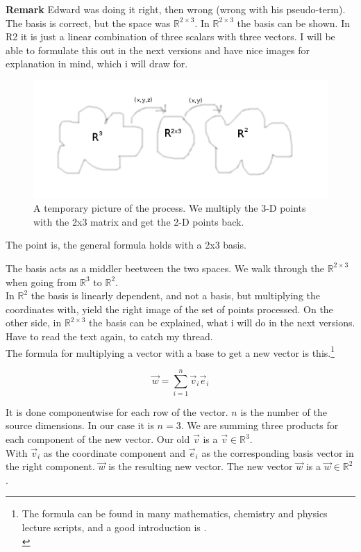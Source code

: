 \documentclass[a4paper]{article}
\begin{document}
\textbf{Remark} Edward was doing it right, then wrong (wrong with his pseudo-term). The basis is correct, but the space was $\mathbb{R}^{2\times{3}}$. In $\mathbb{R}^{2\times{3}}$ the basis can be shown. In R2 it is just a linear combination of three scalars with three vectors. I will be able to formulate this out in the next versions and have nice images for explanation in mind, which i will draw for.
\begin{figure}
\includegraphics{mediator.png}
\caption{A temporary picture of the process. We multiply the 3-D points with the 2x3 matrix and get the 2-D points back.}
\end{figure}

The point is, the general formula holds with a 2x3 basis.

The basis acts as a middler beetween the two spaces. We walk through the $\mathbb{R}^{2\times{3}}$ when going from $\mathbb{R}^{3}$ to $\mathbb{R}^{2}.$\\

In $\mathbb{R}^{2}$ the basis is linearly dependent, and not a basis, but multiplying the coordinates with, yield the right image of the set of points processed. On the other side, in $\mathbb{R}^{2\times{3}}$ the basis can be explained, what i will do in the next versions. Have to read the text again, to catch my thread.\\

The formula for multiplying a vector with a base to get a new vector is this.\footnote{The formula can be found in many mathematics, chemistry and physics lecture scripts, and a good introduction is \cite{Strang1}.\\}

\begin{displaymath}
\vec{w} = \displaystyle\sum_{i=1}^{n} \vec{v}_{i}\vec{e}_{i}
\end{displaymath}

It is done componentwise for each row of the vector. $n$ is the number of the source dimensions. In our case it is $n = 3$. 
We are summing three products for each component of the new vector. Our old $\vec{v}$ is a $\vec{v} \in \mathbb{R}^3$.\\
With $\vec{v}_{i}$ as the coordinate component and $\vec{e}_{i}$ as the corresponding basis vector in the right component. 
$\vec{w}$ is the resulting new vector.  The new vector $\vec{w}$ is a $\vec{w} \in \mathbb{R}^2$.\\
\end{document}
